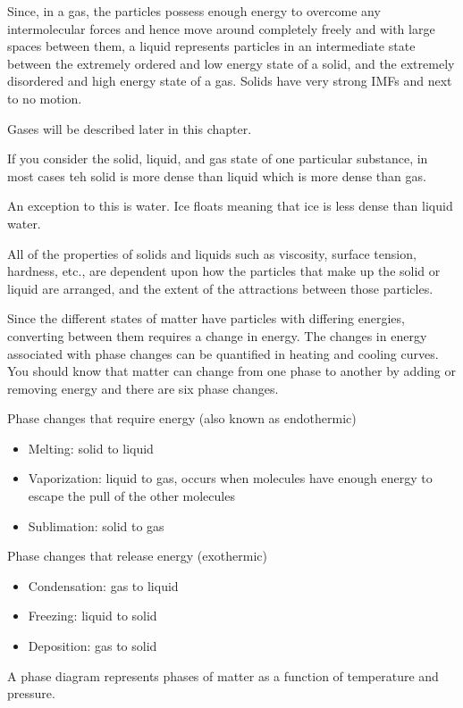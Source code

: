 \documentclass[../chem.tex]{subfiles}
\begin{document}
Since, in a gas, the particles possess enough energy to overcome any intermolecular forces and hence move around completely freely and with large 
spaces between them, a liquid represents particles in an intermediate state between the extremely ordered and low energy state of a solid, and the extremely 
disordered and high energy state of a gas. Solids have very strong IMFs and next to no motion.

Gases will be described later in this chapter.

If you consider the solid, liquid, and gas state of one particular substance, in most cases teh solid is more dense than liquid which is more dense than gas.

An exception to this is water. Ice floats meaning that ice is less dense than liquid water. 

All of the properties of solids and liquids such as viscosity, surface tension, hardness, etc., are dependent upon how the particles 
that make up the solid or liquid are arranged, and the extent of the attractions between those particles. 

Since the different states of matter have particles with differing energies, converting between them requires a change in energy. The 
changes in energy associated with phase changes can be quantified in heating and cooling curves. You should know that matter can change from 
one phase to another by adding or removing energy and there are six phase changes.

Phase changes that require energy (also known as endothermic)
\begin{itemize}
    \item Melting: solid to liquid 
    \item Vaporization: liquid to gas, occurs when molecules have enough energy to escape the pull of the other molecules 
    \item Sublimation: solid to gas 
\end{itemize}

Phase changes that release energy (exothermic)
\begin{itemize}
    \item Condensation: gas to liquid 
    \item Freezing: liquid to solid 
    \item Deposition: gas to solid 
\end{itemize}

A phase diagram represents phases of matter as a function of temperature and pressure. 
\end{document}

